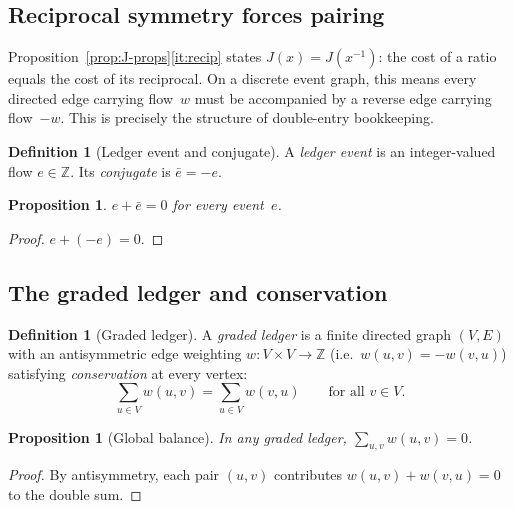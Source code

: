 \documentclass[11pt,a4paper]{article}
\theoremstyle{plain}
\newtheorem{proposition}[theorem]{Proposition}
\theoremstyle{definition}
\newtheorem{definition}[theorem]{Definition}
\theoremstyle{remark}
\newcommand{\Jcost}{J}
\newcommand{\ZZ}{\mathbb{Z}}
\begin{document}
\subsection{Reciprocal symmetry forces pairing}

Proposition~\ref{prop:J-props}\ref{it:recip} states
$\Jcost(x)=\Jcost(x^{-1})$: the cost of a ratio equals the cost of its
reciprocal.  On a discrete event graph, this means every directed edge
carrying flow~$w$ must be accompanied by a reverse edge carrying
flow~$-w$.  This is precisely the structure of double-entry
bookkeeping.

\begin{definition}[Ledger event and conjugate]\label{def:event}
A \emph{ledger event} is an integer-valued flow $e\in\ZZ$.
Its \emph{conjugate} is $\bar e=-e$.
\end{definition}

\begin{proposition}\label{prop:pairing}
$e+\bar e=0$ for every event~$e$.
\end{proposition}

\begin{proof}
$e+(-e)=0$.
\end{proof}

\subsection{The graded ledger and conservation}

\begin{definition}[Graded ledger]\label{def:graded-ledger}
A \emph{graded ledger} is a finite directed graph
$(V,E)$ with an antisymmetric edge weighting
$w:V\times V\to\ZZ$ (i.e.\ $w(u,v)=-w(v,u)$) satisfying
\emph{conservation} at every vertex:
\begin{equation}\label{eq:conservation}
  \sum_{u\in V}w(u,v)=\sum_{u\in V}w(v,u)
  \qquad\text{for all }v\in V.
\end{equation}
\end{definition}

\begin{proposition}[Global balance]\label{prop:global-balance}
In any graded ledger,
$\sum_{u,v}w(u,v)=0$.
\end{proposition}

\begin{proof}
By antisymmetry, each pair $(u,v)$ contributes
$w(u,v)+w(v,u)=0$ to the double sum.
\end{proof}
\end{document}
